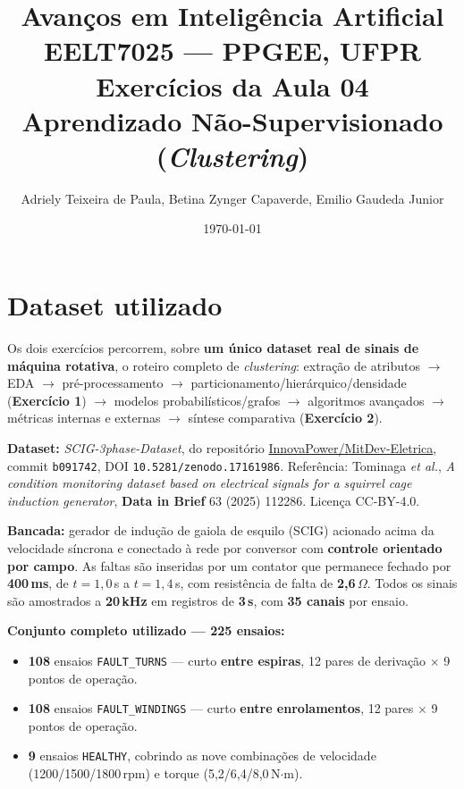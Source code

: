\documentclass[12pt,a4paper]{article}
\title{
    \Large \textbf{Avanços em Inteligência Artificial} \\
    \large EELT7025 --- PPGEE, UFPR \\[0.3cm]
    \normalsize Exercícios da Aula 04 \\
    \normalsize Aprendizado Não-Supervisionado (\emph{Clustering})
}
\author{Adriely Teixeira de Paula, Betina Zynger Capaverde, Emilio Gaudeda Junior}
\date{\today}
\begin{document}
\maketitle
\tableofcontents
\newpage

\section*{Dataset utilizado}

Os dois exercícios percorrem, sobre \textbf{um único dataset real de sinais de máquina rotativa}, o roteiro completo de \emph{clustering}: extração de atributos $\rightarrow$ EDA $\rightarrow$ pré-processamento $\rightarrow$ particionamento/hierárquico/densidade (\textbf{Exercício 1}) $\rightarrow$ modelos probabilísticos/grafos $\rightarrow$ algoritmos avançados $\rightarrow$ métricas internas e externas $\rightarrow$ síntese comparativa (\textbf{Exercício 2}).

\textbf{Dataset:} \emph{SCIG-3phase-Dataset}, do repositório \href{https://github.com/InnovaPower/MitDev-Eletrica}{InnovaPower/MitDev-Eletrica}, commit \texttt{b091742}, DOI \texttt{10.5281/zenodo.17161986}. Referência: Tominaga \emph{et al.}, \emph{A condition monitoring dataset based on electrical signals for a squirrel cage induction generator}, \textbf{Data in Brief} 63 (2025) 112286. Licença CC-BY-4.0.

\textbf{Bancada:} gerador de indução de gaiola de esquilo (SCIG) acionado acima da velocidade síncrona e conectado à rede por conversor com \textbf{controle orientado por campo}. As faltas são inseridas por um contator que permanece fechado por \textbf{400\,ms}, de $t = 1{,}0$\,s a $t = 1{,}4$\,s, com resistência de falta de \textbf{2,6\,$\Omega$}. Todos os sinais são amostrados a \textbf{20\,kHz} em registros de \textbf{3\,s}, com \textbf{35 canais} por ensaio.

\textbf{Conjunto completo utilizado --- 225 ensaios:}
\begin{itemize}[nosep]
    \item \textbf{108} ensaios \texttt{FAULT\_TURNS} --- curto \textbf{entre espiras}, 12 pares de derivação $\times$ 9 pontos de operação.
    \item \textbf{108} ensaios \texttt{FAULT\_WINDINGS} --- curto \textbf{entre enrolamentos}, 12 pares $\times$ 9 pontos de operação.
    \item \textbf{9} ensaios \texttt{HEALTHY}, cobrindo as nove combinações de velocidade (1200/1500/1800\,rpm) e torque (5,2/6,4/8,0\,N$\cdot$m).
\end{itemize}
\end{document}
